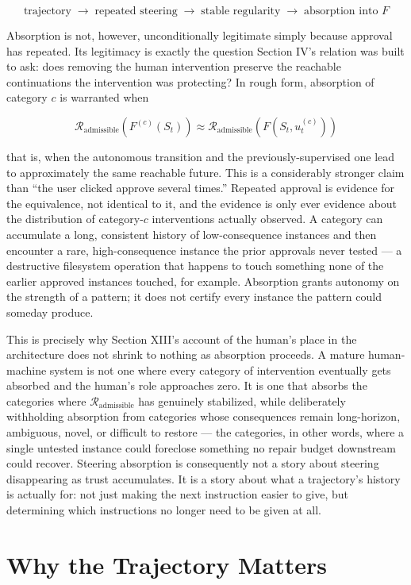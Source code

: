 \documentclass[11pt]{article}
\newcommand{\adm}{\mathrm{admissible}}
\begin{document}
\[
\text{trajectory} \;\rightarrow\; \text{repeated steering} \;\rightarrow\; \text{stable regularity} \;\rightarrow\; \text{absorption into } F
\]

Absorption is not, however, unconditionally legitimate simply because approval has repeated. Its legitimacy is exactly the question Section IV's relation was built to ask: does removing the human intervention preserve the reachable continuations the intervention was protecting? In rough form, absorption of category $c$ is warranted when

\[
\mathcal{R}_\adm\!\left(F^{(c)}(S_t)\right) \approx \mathcal{R}_\adm\!\left(F(S_t, u_t^{(c)})\right)
\]

that is, when the autonomous transition and the previously-supervised one lead to approximately the same reachable future. This is a considerably stronger claim than ``the user clicked approve several times.'' Repeated approval is evidence for the equivalence, not identical to it, and the evidence is only ever evidence about the distribution of category-$c$ interventions actually observed. A category can accumulate a long, consistent history of low-consequence instances and then encounter a rare, high-consequence instance the prior approvals never tested --- a destructive filesystem operation that happens to touch something none of the earlier approved instances touched, for example. Absorption grants autonomy on the strength of a pattern; it does not certify every instance the pattern could someday produce.

This is precisely why Section XIII's account of the human's place in the architecture does not shrink to nothing as absorption proceeds. A mature human-machine system is not one where every category of intervention eventually gets absorbed and the human's role approaches zero. It is one that absorbs the categories where $\mathcal{R}_\adm$ has genuinely stabilized, while deliberately withholding absorption from categories whose consequences remain long-horizon, ambiguous, novel, or difficult to restore --- the categories, in other words, where a single untested instance could foreclose something no repair budget downstream could recover. Steering absorption is consequently not a story about steering disappearing as trust accumulates. It is a story about what a trajectory's history is actually for: not just making the next instruction easier to give, but determining which instructions no longer need to be given at all.

\section{Why the Trajectory Matters}
\end{document}
